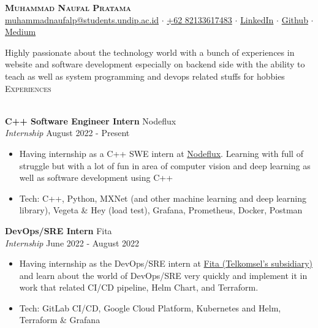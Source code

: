 \documentclass[a4paper]{article}
\newcommand{\lineunder} {
    \vspace*{-8pt} \\
    \hspace*{-18pt} \hrulefill \\
}
\newcommand{\header} [1] {
    {\hspace*{-18pt}\vspace*{6pt} \textsc{#1}}
    \vspace*{-6pt} \lineunder
}
\begin{document}
\vspace*{-40pt}

\vspace*{-10pt}
\begin{center}
	{\Huge \scshape \textbf{Muhammad Naufal Pratama}}\\
	\href{mailto:muhammadnaufalp@students.undip.ac.id}{muhammadnaufalp@students.undip.ac.id} $\cdot$ \href{https://wa.me/6282133617483}{+62 82133617483} $\cdot$ \href{https://linkedin.com/in/mnpratamaa}{LinkedIn} $\cdot$ \href{https://github.com/mhnaufal}{Github} $\cdot$ \href{mprtmma.medium.com}{Medium}\\
\end{center}

Highly passionate about the technology world with a bunch of experiences in website and software development especially on backend side with the ability to teach as well as system programming and devops related stuffs for hobbies\\

\header{Experiences}
\vspace{1mm}

\textbf{C++ Software Engineer Intern} \hfill Nodeflux\\
\textit{Internship} \hfill August 2022 - Present\\
\vspace{-1mm}
\begin{itemize} \itemsep 1pt
	\item Having internship as a C++ SWE intern at \href{https://www.nodeflux.io/}{Nodeflux}. Learning with full of struggle but with a lot of fun in area of computer vision and deep learning as well as software development using C++
	\item Tech: C++, Python, MXNet (and other machine learning and deep learning library), Vegeta \& Hey (load test), Grafana, Prometheus, Docker, Postman
\end{itemize}

\textbf{DevOps/SRE Intern} \hfill Fita\\
\textit{Internship} \hfill June 2022 - August 2022\\
\vspace{-1mm}
\begin{itemize} \itemsep 1pt
	\item Having internship as the DevOps/SRE intern at \href{https://fita.co.id/}{Fita (Telkomsel's subsidiary)} and learn about the world of DevOps/SRE very quickly and implement it in work that related CI/CD pipeline, Helm Chart, and Terraform.
	\item Tech: GitLab CI/CD, Google Cloud Platform, Kubernetes and Helm, Terraform \& Grafana
\end{itemize}
\end{document}
